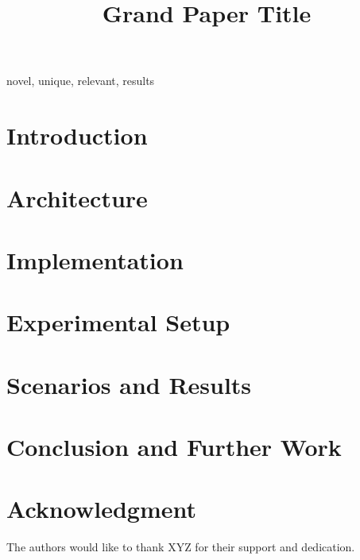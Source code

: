 \documentclass[conference]{IEEEtran}
\begin{document}
\title{Grand Paper Title}

\author{
}

\maketitle

\begin{abstract}

\end{abstract}


\begin{IEEEkeywords}
novel, unique, relevant, results
\end{IEEEkeywords}


\section{Introduction}
\label{sec:introduction}


\section{Architecture}
\label{sec:architecture}


\section{Implementation}
\label{sec:implementation}


\section{Experimental Setup}
\label{sec:setup}


\section{Scenarios and Results}
\label{sec:results}


\section{Conclusion and Further Work}
\label{sec:conclusion}


\section*{Acknowledgment}
\label{sec:acknowledgment}

The authors would like to thank XYZ for their support and dedication.



\end{document}
